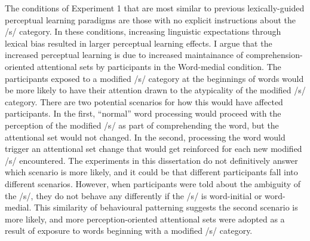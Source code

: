 The conditions of Experiment 1 that are most similar to previous lexically-guided perceptual learning paradigms are those with no explicit instructions about the /s/ category.
In these conditions, increasing linguistic expectations through lexical bias resulted in larger perceptual learning effects.
I argue that the increased perceptual learning is due to increased maintainance of comprehension-oriented attentional sets by participants in the Word-medial condition.
The participants exposed to a modified /s/ category at the beginnings of words would be more likely to have their attention drawn to the atypicality of the modified /s/ category.
There are two potential scenarios for how this would have affected participants.
In the first, ``normal'' word processing would proceed with the perception of the modified /s/ as part of comprehending the word, but the attentional set would not changed.
In the second, processing the word would trigger an attentional set change that would get reinforced for each new modified /s/ encountered.
The experiments in this dissertation do not definitively answer which scenario is more likely, and it could be that different participants fall into different scenarios.
However, when participants were told about the ambiguity of the /s/, they do not behave any differently if the /s/ is word-initial or word-medial.
This similarity of behavioural patterning suggests the second scenario is more likely, and more perception-oriented attentional sets were adopted as a result of exposure to words beginning with a modified /s/ category.

